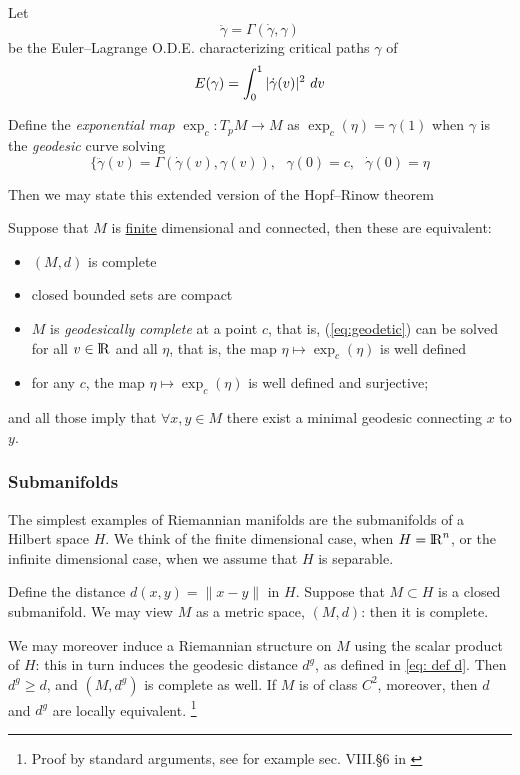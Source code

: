 \documentclass[twoside,a4paper,english]{article}
\begin{document}
Let  
\[ \ddot \gamma = \Gamma(\dot  \gamma,\gamma) \]
be the Euler--Lagrange O.D.E.  characterizing critical paths $\gamma$ of
\[ E(\gamma)=\int_0^1 |\overdot \gamma(v)|^2 ~dv \]

Define the \emph{exponential map} $\exp_c : T_pM \to M$
as $\exp_c (\eta) = \gamma(1)$ when $\gamma$ is the
\emph{geodesic} curve solving
\begin{equation}
  \Big \{\ddot \gamma(v) = \Gamma(\dot  \gamma(v),\gamma(v)), ~~~
  \gamma(0)=c, ~~~\dot  \gamma(0)=\eta \label{eq:geodetic}
\end{equation}  
  
Then we may state this extended version of the Hopf--Rinow theorem
 
\begin{Theorem}\label{Hopf-Rinow}
   Suppose that 
   $M$ is \underline{finite} dimensional and connected,
   then these are equivalent:
   \begin{itemize}
   \item 
     $(M,d)$ is complete
   \item closed bounded sets are compact
   \item 
     $M$ is \emph{geodesically complete} at a point $c$, that is,
     (\ref{eq:geodetic}) can be solved for all $v\in{\protect\mathrm{l\hskip-0.15em R}}$ and all $\eta$,
     that is,       the map $\eta\mapsto \exp_c(\eta)$  is well defined 
   \item 
     for any $c$, the map $\eta\mapsto \exp_c(\eta)$  is well defined and
     surjective; 
   \end{itemize}
   and all
   those imply that $\forall x,y\in M$ there   exist a minimal geodesic 
   connecting $x$ to $y$.
 \end{Theorem}
 


\subsubsection{Submanifolds}


The simplest examples of Riemannian
manifolds are the submanifolds of a Hilbert space $H$.
We think of the finite dimensional case, when $H={\protect\mathrm{l\hskip-0.15em R}}^n$,
or the infinite dimensional case, when we assume that $H$ is
separable.

\begin{Proposition}\label{sotto H}
  Define the distance  $d(x,y)=\|x-y\|$ in $H$.
  Suppose that $M\subset H$ is a closed submanifold.
  We may view $M$ as a metric space,  $(M,d)$: then it is complete.
  
  We may moreover induce a Riemannian structure on $M$ using the
  scalar product of $H$: this in turn induces the geodesic distance
  $d^g$, as defined in \eqref{eq: def d}.
  Then $d^g\ge d$, and $(M,d^g)$ is complete as well.
  If $M$ is of class $C^2$,
  moreover, then $d$ and $d^g$ are locally equivalent.%
  \footnote{Proof by standard arguments, see for example 
  sec. VIII.\S6 in \cite{Lang:FDG}}
\end{Proposition}
\end{document}
